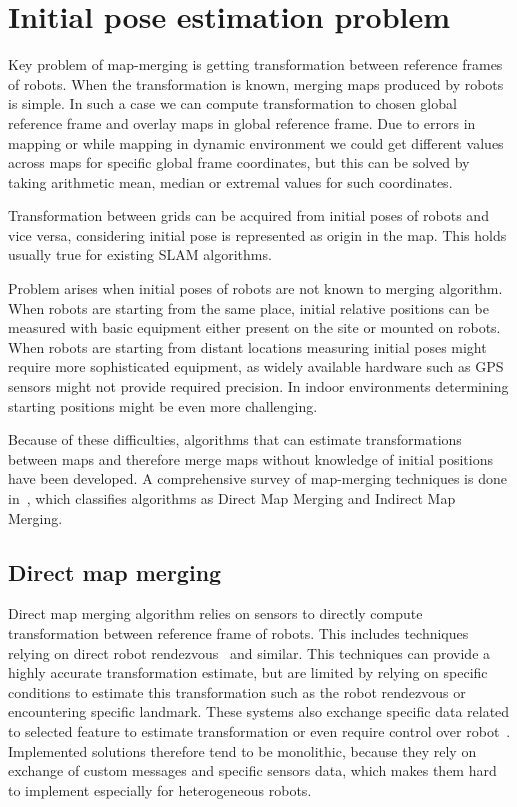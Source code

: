\chapter{Initial pose estimation problem}
\label{chap:map-merging-intro}

Key problem of map-merging is getting transformation between reference frames of robots. When the transformation is known, merging maps produced by robots is simple. In such a case we can compute transformation to chosen global reference frame and overlay maps in global reference frame. Due to errors in mapping or while mapping in dynamic environment we could get different values across maps for specific global frame coordinates, but this can be solved by taking arithmetic mean, median or extremal values for such coordinates.

Transformation between grids can be acquired from initial poses of robots and vice versa, considering initial pose is represented as origin in the map. This holds usually true for existing \gls{SLAM} algorithms.

Problem arises when initial poses of robots are not known to merging algorithm. When robots are starting from the same place, initial relative positions can be measured with basic equipment either present on the site or mounted on robots. When robots are starting from distant locations measuring initial poses might require more sophisticated equipment, as widely available hardware such as \gls{GPS} sensors might not provide required precision. In indoor environments determining starting positions might be even more challenging.

Because of these difficulties, algorithms that can estimate transformations between maps and therefore merge maps without knowledge of initial positions have been developed. A comprehensive survey of map-merging techniques is done in~\cite{Lee2012}, which classifies algorithms as Direct Map Merging and Indirect Map Merging.

\section{Direct map merging}

Direct map merging algorithm relies on sensors to directly compute transformation between reference frame of robots. This includes techniques relying on direct robot rendezvous~\cite{Zhou2006} and similar. This techniques can provide a highly accurate transformation estimate, but are limited by relying on specific conditions to estimate this transformation such as the robot rendezvous or encountering specific landmark. These systems also exchange specific data related to selected feature to estimate transformation or even require control over robot~\cite{Konolige2003}. Implemented solutions therefore tend to be monolithic, because they rely on exchange of custom messages and specific sensors data, which makes them hard to implement especially for heterogeneous robots.

